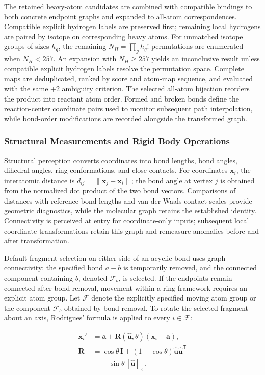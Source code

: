 The retained heavy-atom candidates are combined with compatible bindings to both concrete endpoint graphs and expanded to all-atom correspondences. Compatible explicit hydrogen labels are preserved first; remaining local hydrogens are paired by isotope on corresponding heavy atoms. For unmatched isotope groups of sizes $h_g$, the remaining $N_H=\prod_g h_g!$ permutations are enumerated when $N_H<257$. An expansion with $N_H\ge 257$ yields an inconclusive result unless compatible explicit hydrogen labels resolve the permutation space. Complete maps are deduplicated, ranked by score and atom-map sequence, and evaluated with the same +2 ambiguity criterion. The selected all-atom bijection reorders the product into reactant atom order. Formed and broken bonds define the reaction-center coordinate pairs used to monitor subsequent path interpolation, while bond-order modifications are recorded alongside the transformed graph.

\subsubsection{Structural Measurements and Rigid Body Operations}
Structural perception converts coordinates into bond lengths, bond angles, dihedral angles, ring conformations, and close contacts. For coordinates $\mathbf{x}_i$, the interatomic distance is $d_{ij}=\|\mathbf{x}_j-\mathbf{x}_i\|$; the bond angle at vertex $j$ is obtained from the normalized dot product of the two bond vectors. Comparisons of distances with reference bond lengths and van der Waals contact scales provide geometric diagnostics, while the molecular graph retains the established identity. Connectivity is perceived at entry for coordinate-only inputs; subsequent local coordinate transformations retain this graph and remeasure anomalies before and after transformation.

Default fragment selection on either side of an acyclic bond uses graph connectivity: the specified bond $a-b$ is temporarily removed, and the connected component containing $b$, denoted $\mathcal{F}_b$, is selected. If the endpoints remain connected after bond removal, movement within a ring framework requires an explicit atom group. Let $\mathcal{F}$ denote the explicitly specified moving atom group or the component $\mathcal{F}_b$ obtained by bond removal. To rotate the selected fragment about an axis, Rodrigues' formula is applied to every $i\in\mathcal{F}$:

\begin{equation}\label{eq:methods-02}
\begin{aligned}
\mathbf{x}_i'&=\mathbf{a}+\mathbf{R}(\hat{\mathbf{u}},\theta)(\mathbf{x}_i-\mathbf{a}),\\
\mathbf{R}&=\cos\theta\,\mathbf{I}+(1-\cos\theta)\hat{\mathbf{u}}\hat{\mathbf{u}}^{\mathsf{T}}\\
&\quad+\sin\theta\,[\hat{\mathbf{u}}]_\times.
\end{aligned}
\end{equation}


